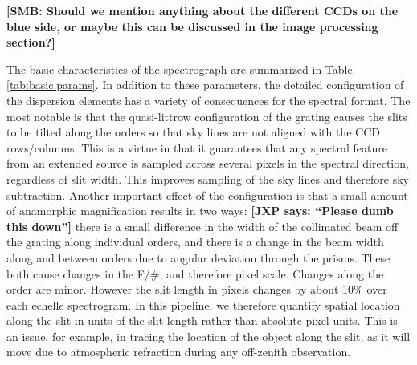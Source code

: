 \documentclass[12pt,preprint]{aastex}
\begin{document}
{\bf [SMB: Should we mention anything about the different CCDs on the blue
side, or maybe this can be discussed in the image processing section?]}

The basic characteristics of the spectrograph are summarized in Table
\ref{tab:basic.params}.  In addition to these parameters, the detailed
configuration of the dispersion elements has a variety of consequences
for the spectral format.  The most notable is that the quasi-littrow
configuration of the grating causes the slits to be tilted along the
orders so that sky lines are not aligned with the CCD rows/columns.
This is a virtue in that it guarantees that any spectral feature from
an extended source is sampled across several pixels in the spectral
direction, regardless of slit width. This improves sampling of the sky
lines and therefore sky subtraction.  Another important effect of the
configuration is that a small amount of anamorphic magnification
results in two ways: 
{\bf [JXP says: ``Please dumb this down'']}
there is a small difference in the width of the
collimated beam off the grating along individual orders, and there is
a change in the beam width along and between orders due to angular
deviation through the prisms.  These both cause changes in the F/\#,
and therefore pixel scale.  Changes along the order are minor.
However the slit length in pixels changes by about 10\% over 
each echelle spectrogram.  
In this pipeline, we therefore quantify spatial location
along the slit in units of the slit length rather than absolute
pixel units.
This is an issue, for example, in tracing the location of the object
along the slit, as it will move due to atmospheric refraction during
any off-zenith observation.
\end{document}
